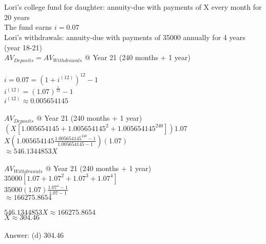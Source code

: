 \documentclass[12pt]{article}
\begin{document}
\section{}
Lori's college fund for daughter: annuity-due with payments of X every month for 20 years\\
The fund earns $i=0.07$\\
Lori's withdrawals: annuity-due with payments of 35000 annually for 4 years (year 18-21)\\
$AV_{Deposits}=AV_{Withdrawals}$ @ Year 21 (240 months + 1 year)\\
\\
$i=0.07=(1+i^{(12)})^{12}-1$\\
$i^{(12)}=(1.07)^{\frac{1}{12}}-1$\\
$i^{(12)}\approx0.005654145$\\
\\
$AV_{Deposits}$ @ Year 21 (240 months + 1 year)\\
$(X[1.005654145+1.005654145^2+1.005654145^{240}])1.07$\\
$X(1.005654145\frac{1.005654145^{240}-1}{1.005654145-1})(1.07)$\\
$\approx546.1344853X$\\
\\
$AV_{Withdrawals}$ @ Year 21 (240 months + 1 year)\\
$35000[1.07+1.07^2+1.07^3+1.07^4]$\\
$35000(1.07)\frac{1.07^{4}-1}{1.07-1}$\\
$\approx166275.8654$\\
\\
$546.1344853X\approx166275.8654$\\
$X\approx304.46$\\
\\
Answer: (d) 304.46
\end{document}
